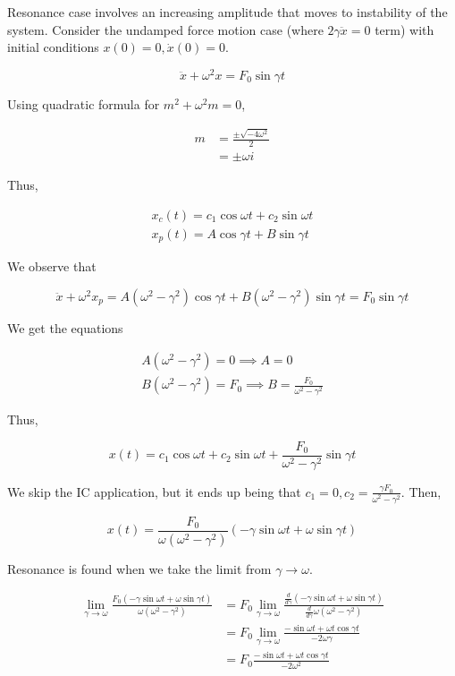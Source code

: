 Resonance case involves an increasing amplitude that moves to instability of the system.
Consider the undamped force motion case (where $2\gamma\ddot x =0$ term) with initial conditions $x(0)=0,\dot x(0) = 0$.

\begin{equation}
    \ddot x + \omega^2 x=F_0\sin\gamma t
\end{equation}

Using quadratic formula for $m^2+\omega^2 m=0$,

\begin{align}
    m&=\frac{\pm \sqrt{-4\omega^2}}{2}\\
    &=\pm \omega i
\end{align}

Thus,

\begin{eqnarray}
    x_c(t)=c_1\cos\omega t+c_2\sin\omega t\\
    x_p(t)=A\cos\gamma t+B\sin \gamma t
\end{eqnarray}

We observe that

\begin{equation}
    \ddot x+\omega^2x_p=A(\omega^2-\gamma^2)\cos\gamma t+B(\omega^2-\gamma^2)\sin\gamma t=F_0\sin\gamma t
\end{equation}

We get the equations

\begin{eqnarray}
    A(\omega^2-\gamma^2)=0\implies A=0\\
    B(\omega^2-\gamma^2)=F_0\implies B=\frac{F_0}{\omega^2-\gamma^2}
\end{eqnarray}

Thus,

\begin{equation}
    x(t)=c_1\cos\omega t+c_2\sin\omega t+\frac{F_0}{\omega^2-\gamma^2}\sin\gamma t
\end{equation}

We skip the IC application, but it ends up being that $c_1=0,c_2=\frac{\gamma F_0}{\omega^2-\gamma^2}$.
Then,

\begin{equation}
    x(t)=\frac{F_0}{\omega(\omega^2-\gamma^2)}\left(-\gamma \sin\omega t+\omega \sin\gamma t\right)
\end{equation}

Resonance is found when we take the limit from $\gamma\to \omega$.

\begin{align}
    \lim_{\gamma\to \omega}\frac{F_0(-\gamma \sin\omega t+\omega \sin\gamma t)}{\omega(\omega^2-\gamma^2)}&=F_0\lim_{\gamma\to\omega}\frac{\frac{d}{d\gamma}(-\gamma \sin\omega t+\omega \sin\gamma t)}{\frac{d}{d\gamma}\omega(\omega^2-\gamma^2)}\\
    &=F_0\lim_{\gamma\to \omega}\frac{-\sin\omega t+\omega t\cos \gamma t}{-2\omega\gamma}\\
    &=F_0\frac{-\sin\omega t+\omega t\cos\gamma t}{-2\omega^2}
\end{align}

